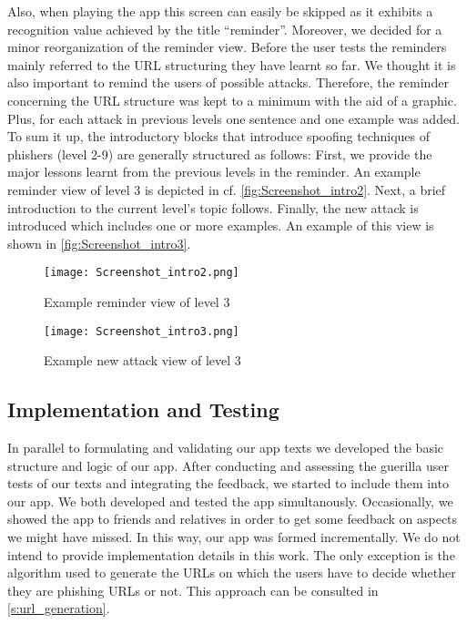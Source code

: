 Also, when playing the app this screen can easily be skipped as it exhibits a recognition value achieved by the title ``reminder''. 
Moreover, we decided for a minor reorganization of the reminder view. 
Before the user tests the reminders mainly referred to the URL structuring they have learnt so far. 
We thought it is also important to remind the users of possible attacks. 
Therefore, the reminder concerning the URL structure was kept to a minimum with the aid of a graphic. 
Plus, for each attack in previous levels one sentence and one example was added.  
To sum it up, the introductory blocks that introduce spoofing techniques of phishers (level 2-9) are generally structured as follows:
First, we provide the major lessons learnt from the previous levels in the reminder.
An example reminder view of level 3 is depicted in  cf. \autoref{fig:Screenshot_intro2}.
Next, a brief introduction to the current level's topic follows.
Finally, the new attack is introduced which includes one or more examples.
An example of this view is shown in \autoref{fig:Screenshot_intro3}.

\begin{figure}[hHtbp]
\centering
\texttt{[image: Screenshot\_intro2.png]}
\caption{Example reminder view of level 3}
\label{fig:Screenshot_intro2}
\end{figure}


\begin{figure}[hHtbp]
\centering
\texttt{[image: Screenshot\_intro3.png]}
\caption{Example new attack view of level 3}
\label{fig:Screenshot_intro3}
\end{figure}

\subsection{Implementation and Testing}
In parallel to formulating and validating our app texts we developed the basic structure and logic of our app.
After conducting and assessing the guerilla user tests of our texts and integrating the feedback, we started to include them into our app.
We both developed and tested the app simultanously.
Occasionally, we showed the app to friends and relatives in order to get some feedback on aspects we might have missed.
In this way, our app was formed incrementally. 
We do not intend to provide implementation details in this work.
The only exception is the algorithm used to generate the URLs on which the users have to decide whether they are phishing URLs or not. This approach can be consulted in \autoref{s:url_generation}.
